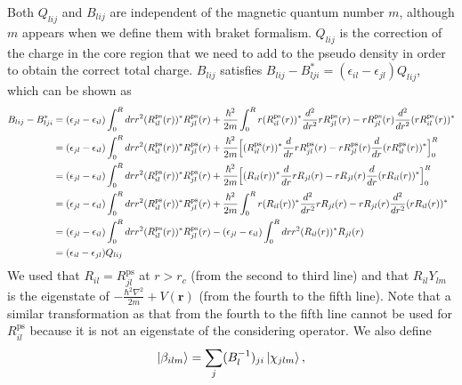 \documentclass{article}
\begin{document}
Both $Q_{lij}$ and $B_{lij}$ are independent of the magnetic quantum number $m$, although $m$ appears when we define them with braket formalism.
$Q_{lij}$ is the correction of the charge in the core region that we need to add to the pseudo density in order to obtain the correct total charge.
$B_{lij}$ satisfies $B_{lij} - B_{lji}^* = (\epsilon_{il} - \epsilon_{jl}) Q_{lij}$, which can be shown as
\begin{align}
  B_{lij} - B_{lji}^* 
  &=
  (\epsilon_{jl} - \epsilon_{il}) \int_0^R dr r^2 (R^{\text{ps}}_{il}(r))^* R^{\text{ps}}_{jl}(r)
  + \frac{\hbar^2}{2m} \int_0^R r (R^{\text{ps}}_{il}(r))^* \frac{d^2}{dr^2} rR^{\text{ps}}_{jl}(r) - rR^{\text{ps}}_{jl}(r) \frac{d^2}{dr^2} (rR^{\text{ps}}_{il}(r))^* 
  \nonumber
  \\&=
  (\epsilon_{jl} - \epsilon_{il}) \int_0^R dr r^2 (R^{\text{ps}}_{il}(r))^* R^{\text{ps}}_{jl}(r)
  + \frac{\hbar^2}{2m}
  \Bigl[
    (R^{\text{ps}}_{il}(r))^* \frac{d}{dr} rR^{\text{ps}}_{jl}(r) - rR^{\text{ps}}_{jl}(r) \frac{d}{dr} (rR^{\text{ps}}_{il}(r))^* 
  \Bigr]_0^R
  \nonumber
  \\&=
  (\epsilon_{jl} - \epsilon_{il}) \int_0^R dr r^2 (R^{\text{ps}}_{il}(r))^* R^{\text{ps}}_{jl}(r)
  + \frac{\hbar^2}{2m}
  \Bigl[
    (R_{il}(r))^* \frac{d}{dr} rR_{jl}(r) - rR_{jl}(r) \frac{d}{dr} (rR_{il}(r))^* 
  \Bigr]_0^R
  \nonumber
  \\&=
  (\epsilon_{jl} - \epsilon_{il}) \int_0^R dr r^2 (R^{\text{ps}}_{il}(r))^* R^{\text{ps}}_{jl}(r)
  + \frac{\hbar^2}{2m} \int_0^R r (R_{il}(r))^* \frac{d^2}{dr^2} rR_{jl}(r) - rR_{jl}(r) \frac{d^2}{dr^2} (rR_{il}(r))^* 
  \nonumber
  \\&=
  (\epsilon_{jl} - \epsilon_{il}) \int_0^R dr r^2 (R^{\text{ps}}_{il}(r))^* R^{\text{ps}}_{jl}(r) - (\epsilon_{jl} - \epsilon_{il}) \int_0^R dr r^2 (R_{il}(r))^* R_{jl}(r)
  \nonumber 
  \\&= (\epsilon_{il} - \epsilon_{jl}) Q_{lij}
\end{align}
We used that $R_{il} = R^{\text{ps}}_{jl}$ at $r > r_c$ (from the second to third line) and that $R_{il}Y_{lm}$ is the eigenstate of $ - \frac{\hbar^2\nabla^2}{2m} + V(\bm{r}) $ (from the fourth to the fifth line). Note that a similar transformation as that from the fourth to the fifth line cannot be used for $R^{\text{ps}}_{il}$ because it is not an eigenstate of the considering operator.
We also define
\begin{align}
  \ket{\beta_{ilm}} = \sum_j (B^{-1}_l)_{ji} \ket{\chi_{jlm}},
\end{align}
\end{document}
